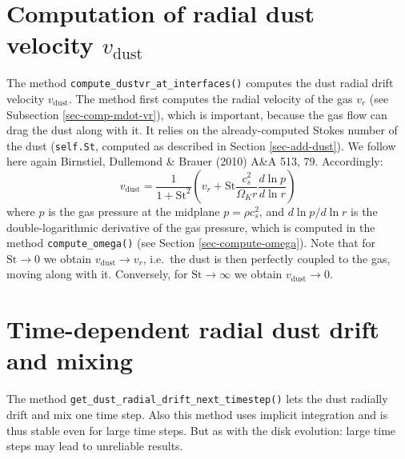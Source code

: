 \documentclass{book}
\newcommand{\code}[1]{{\small\tt #1}}
\begin{document}
\section{Computation of radial dust velocity $v_{\mathrm{dust}}$}
\label{sec-comp-vdrift}
The method \code{compute\_dustvr\_at\_interfaces()} computes the dust radial
drift velocity $v_{\mathrm{dust}}$. The method first computes the radial
velocity of the gas $v_r$ (see Subsection \ref{sec-comp-mdot-vr}), which is important,
because the gas flow can drag the dust along with it. It relies on the
already-computed Stokes number of the dust (\code{self.St}, computed as
described in Section \ref{sec-add-dust}). We follow here again Birnstiel,
Dullemond \& Brauer (2010) A\&A 513, 79. Accordingly:
\begin{equation}\label{eq-radial-dust-velocity}
  v_{\mathrm{dust}} = \frac{1}{1+\mathrm{St}^2} \left(v_r +
  \mathrm{St} \frac{c_s^2}{\Omega_Kr}\frac{d\ln p}{d\ln r}\right)
\end{equation}
where $p$ is the gas pressure at the midplane $p=\rho c_s^2$, and $d\ln p/d\ln
r$ is the double-logarithmic derivative of the gas pressure, which is computed
in the method \code{compute\_omega()} (see Section
\ref{sec-compute-omega}).  Note that for $\mathrm{St}\rightarrow 0$ we obtain
$v_{\mathrm{dust}} \rightarrow v_r$, i.e.~the dust is then perfectly coupled to
the gas, moving along with it. Conversely, for $\mathrm{St}\rightarrow \infty$
we obtain $v_{\mathrm{dust}} \rightarrow 0$.

\section{Time-dependent radial dust drift and mixing}
\label{subsec-timedep-dustdriftmix}
The method \code{get\_dust\_radial\_drift\_next\_timestep()} lets the
dust radially drift and mix one time step. Also this method uses implicit
integration and is thus stable even for large time steps. But as with the
disk evolution: large time steps may lead to unreliable results.
\end{document}
